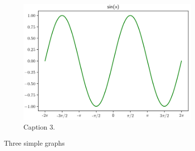 \documentclass[11pt,a4paper,english,twoside,notitlepage,openright]{article}
\begin{document}
\begin{figure}[!h]
\begin{subfigure}[b]{0.3\textwidth}
         \includegraphics[width=\textwidth]{figures/sin.png}
         \caption{Caption 3.}
         \label{fig:lab}
     \end{subfigure}
        \caption{Three simple graphs}
        \label{fig:lab}
\end{figure}
\end{document}
